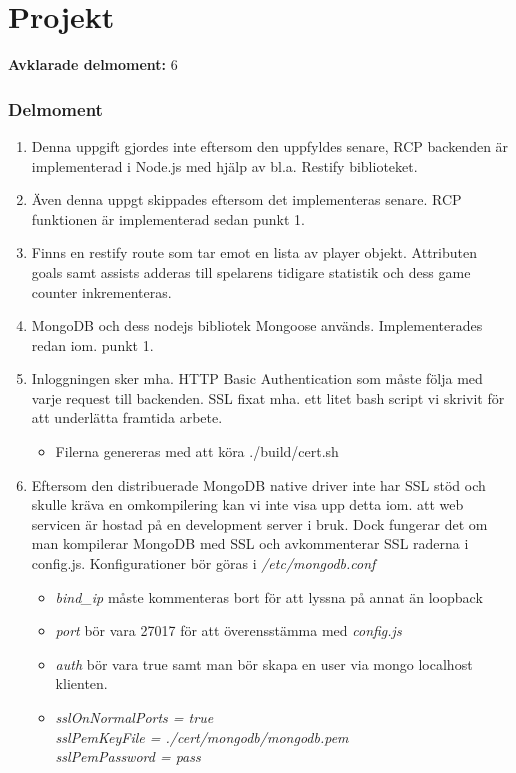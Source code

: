 \documentclass[swedish,a4paper]{article}
\title{\TITLE}
\author{\AUTHOR}
\begin{document}
\maketitle

\section{Projekt}

\textbf{Avklarade delmoment:} 6 \\

\subsubsection{Delmoment}
\begin{enumerate}
  \item Denna uppgift gjordes inte eftersom den uppfyldes senare, RCP
    backenden är implementerad i Node.js med hjälp av bl.a. Restify
    biblioteket.
  \item Även denna uppgt skippades eftersom det implementeras senare.
    RCP funktionen är implementerad sedan punkt 1.
  \item Finns en restify route som tar emot en lista av player objekt.
    Attributen goals samt assists adderas till spelarens tidigare
    statistik och dess game counter inkrementeras.
  \item MongoDB och dess nodejs bibliotek Mongoose används.
    Implementerades redan iom. punkt 1.
  \item Inloggningen sker mha. HTTP Basic Authentication som måste följa
    med varje request till backenden. SSL fixat mha. ett litet bash
    script vi skrivit för att underlätta framtida arbete.
    \begin{itemize}
      \item Filerna genereras med att köra ./build/cert.sh
    \end{itemize}
  \item Eftersom den distribuerade MongoDB native driver inte har SSL
    stöd och skulle kräva en omkompilering kan vi inte visa upp detta
    iom.  att web servicen är hostad på en development server i bruk.
    Dock fungerar det om man kompilerar MongoDB med SSL och
    avkommenterar SSL raderna i config.js. Konfigurationer bör göras i
    \textit{/etc/mongodb.conf}
    \begin{itemize}
      \item \textit{bind\_ip} måste kommenteras bort för att lyssna på annat än
        loopback
      \item \textit{port} bör vara 27017 för att överensstämma med
        \textit{config.js}
      \item \textit{auth} bör vara true samt man bör skapa en user via
        mongo localhost klienten.
      \item \textit{sslOnNormalPorts = true\\
        sslPemKeyFile = ./cert/mongodb/mongodb.pem\\
        sslPemPassword = pass}
    \end{itemize}
\end{enumerate}
\end{document}
